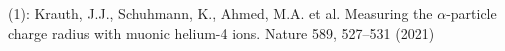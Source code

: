 \documentclass[preview]{standalone}
\begin{document}
\begin{center}
(1): Krauth, J.J., Schuhmann, K., Ahmed, M.A. et al. Measuring the $\alpha$-particle charge radius with muonic helium-4 ions. Nature 589, 527–531 (2021)
\end{center}
\end{document}
